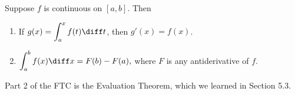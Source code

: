 \begin{frame}
\begin{theorem}
Suppose $f$ is continuous on $[a, b]$.  Then 
\begin{enumerate}
\item  If $g(x) = \displaystyle \int_a^x f(t) \diff t$, then $g'(x) = f(x)$.  
\item  $\displaystyle \int_a^b f(x) \diff x = F(b) - F(a),$ where $F$ is any antiderivative of $f$.
\end{enumerate}
\end{theorem}
Part 2 of the FTC is the Evaluation Theorem, which we learned in Section 5.3.
\end{frame}
